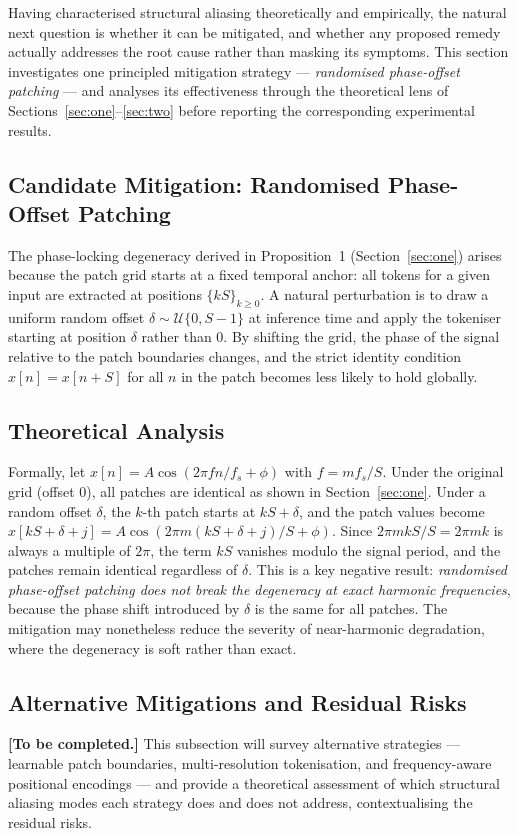 Having characterised structural aliasing theoretically and empirically, the natural next question is whether it can be mitigated, and whether any proposed remedy actually addresses the root cause rather than masking its symptoms.
This section investigates one principled mitigation strategy — \emph{randomised phase-offset patching} — and analyses its effectiveness through the theoretical lens of Sections~\ref{sec:one}–\ref{sec:two} before reporting the corresponding experimental results.

\subsection{Candidate Mitigation: Randomised Phase-Offset Patching}

The phase-locking degeneracy derived in Proposition~1 (Section~\ref{sec:one}) arises because the patch grid starts at a fixed temporal anchor: all tokens for a given input are extracted at positions $\{kS\}_{k \geq 0}$.
A natural perturbation is to draw a uniform random offset $\delta \sim \mathcal{U}\{0, S-1\}$ at inference time and apply the tokeniser starting at position $\delta$ rather than 0.
By shifting the grid, the phase of the signal relative to the patch boundaries changes, and the strict identity condition $x[n] = x[n+S]$ for all $n$ in the patch becomes less likely to hold globally.

\subsection{Theoretical Analysis}

Formally, let $x[n] = A\cos(2\pi f n / f_s + \phi)$ with $f = m f_s / S$.
Under the original grid (offset 0), all patches are identical as shown in Section~\ref{sec:one}.
Under a random offset $\delta$, the $k$-th patch starts at $kS + \delta$, and the patch values become $x[kS + \delta + j] = A\cos(2\pi m(kS + \delta + j)/S + \phi)$.
Since $2\pi m k S / S = 2\pi m k$ is always a multiple of $2\pi$, the term $kS$ vanishes modulo the signal period, and the patches remain identical regardless of $\delta$.
This is a key negative result: \emph{randomised phase-offset patching does not break the degeneracy at exact harmonic frequencies}, because the phase shift introduced by $\delta$ is the same for all patches.
The mitigation may nonetheless reduce the severity of near-harmonic degradation, where the degeneracy is soft rather than exact.

\subsection{Alternative Mitigations and Residual Risks}

\noindent\textbf{[To be completed.]}
This subsection will survey alternative strategies — learnable patch boundaries, multi-resolution tokenisation, and frequency-aware positional encodings — and provide a theoretical assessment of which structural aliasing modes each strategy does and does not address, contextualising the residual risks.
